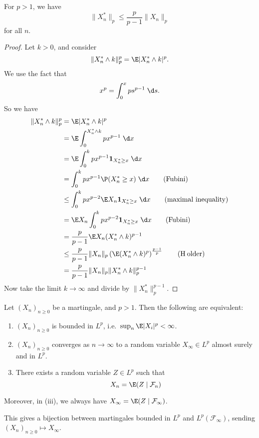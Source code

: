 \documentclass[a4paper]{article}
\begin{document}
\begin{lemma}
  For $p > 1$, we have
  \[
    \|X_n^*\|_p \leq \frac{p}{p - 1} \|X_n\|_p
  \]
  for all $n$.
\end{lemma}

\begin{proof}
  Let $k > 0$, and consider
  \[
    \|X_n^* \wedge k \|^p_p = \E |X_n^* \wedge k|^p.
  \]
  We use the fact that
  \[
    x^p = \int_0^x p s^{p - 1}\;\d s.
  \]
  So we have
  \begin{align*}
    \|X_n^* \wedge k\|^p_p &= \E|X_n^* \wedge k|^p\\
    &= \E \int_0^{X_n^* \wedge k} p x^{p - 1}\;\d x\\
    &= \E \int_0^k p x^{p - 1} \mathbf{1}_{X_n^* \geq x}\;\d x\\
    &= \int_0^k p x^{p - 1} \P(X_n^* \geq x)\;\d x\tag{Fubini}\\
    &\leq \int_0^k px^{p - 2} \E X_n \mathbf{1}_{X_n^* \geq x} \;\d x\tag{maximal inequality}\\
    &= \E X_n \int_0^k p x^{p - 2} \mathbf{1}_{X_n^* \geq x}\;\d x \tag{Fubini}\\
    &= \frac{p}{p - 1} \E X_n (X_n^* \wedge k) ^{p - 1}\\
    &\leq \frac{p}{p - 1} \|X_n\|_p \left(\E(X_n^* \wedge k)^p\right)^{\frac{p - 1}{p}}\tag{H\:older}\\
    &= \frac{p}{p - 1} \|X_n\|_p \|X_n^* \wedge k\|_p^{p - 1}
  \end{align*}
  Now take the limit $k \to \infty$ and divide by $\|X_n^*\|_p^{p - 1}$.
\end{proof}

\begin{thm}
  Let $(X_n)_{n \geq 0}$ be a martingale, and $p > 1$. Then the following are equivalent:
  \begin{enumerate}
    \item $(X_n)_{n \geq 0}$ is bounded in $L^p$, i.e.\ $\sup_n \E |X_i|^p < \infty$.
    \item $(X_n)_{n \geq 0}$ converges as $n \to \infty$ to a random variable $X_\infty \in L^p$ almost surely and in $L^p$.
    \item There exists a random variable $Z \in L^p$ such that
      \[
        X_n = \E (Z \mid \mathcal{F}_n)
      \]
  \end{enumerate}
  Moreover, in (iii), we always have $X_\infty = \E(Z \mid \mathcal{F}_\infty)$.
\end{thm}
This gives a bijection between martingales bounded in $L^p$ and $L^p(\mathcal{F}_\infty)$, sending $(X_n)_{n \geq 0} \mapsto X_\infty$.
\end{document}
